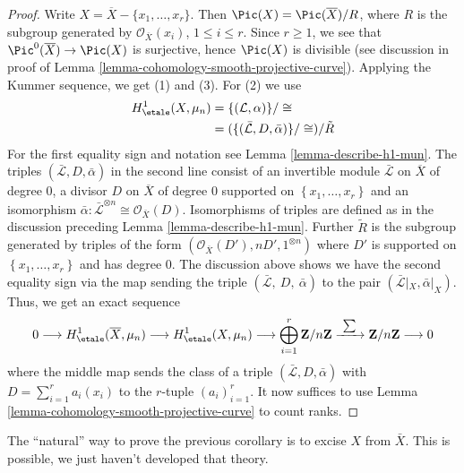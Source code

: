 \begin{proof}
Write $X = \overline{X} - \{ x_1, \ldots, x_r\}$. Then
$\Pic(X) = \Pic(\overline{X})/ R$, where $R$ is the subgroup generated by
$\mathcal{O}_{\overline{X}}(x_i)$, $1 \leq i \leq r$.
Since $r \geq 1$, we see that $\Pic^0(\overline{X}) \to \Pic(X)$
is surjective, hence $\Pic(X)$ is divisible (see discussion in proof
of Lemma \ref{lemma-cohomology-smooth-projective-curve}).
Applying the Kummer sequence, we get (1) and (3). For (2) we use
\begin{align*}
H_\etale^1(X, \mu_n)
& =
\{(\mathcal L, \alpha)\}/\cong \\
& =
(\{(\bar{\mathcal L}, D, \bar \alpha)\}/\cong)/\tilde{R}
\end{align*}
For the first equality sign and notation see Lemma \ref{lemma-describe-h1-mun}.
The triples $(\bar{\mathcal L}, D, \bar \alpha)$ in the second line
consist of an invertible module $\bar{\mathcal L}$ on $\overline{X}$
of degree $0$, a divisor $D$ on $\overline{X}$ of degree $0$ supported on
$\left\{x_1, \ldots, x_r\right\}$ and an isomorphism
$\bar{\alpha}: \bar{\mathcal L}^{\otimes n} \cong \mathcal{O}_{\bar{X}}(D)$.
Isomorphisms of triples are defined as in the discussion preceding
Lemma \ref{lemma-describe-h1-mun}.
Further $\tilde{R}$ is the subgroup generated by triples of the form
$(\mathcal{O}_{\overline{X}}(D'), n D', 1^{\otimes n})$
where $D'$ is supported on $\left\{x_1, \ldots, x_r\right\}$ and has degree 0.
The discussion above shows we have the second equality sign via
the map sending the triple $(\bar{\mathcal L},\ D,\ \bar \alpha)$
to the pair $(\bar{\mathcal L}|_X, \bar \alpha|_X)$. Thus,
we get an exact sequence
$$
0 \longrightarrow
H_\etale^1(\overline{X}, \mu_n) \longrightarrow
H_\etale^1(X, \mu_n) \longrightarrow
\bigoplus_{i = 1}^r \mathbf{Z}/n\mathbf{Z}
\xrightarrow{\ \sum\ }
\mathbf{Z}/n\mathbf{Z} \longrightarrow 0
$$
where the middle map sends the class of a triple
$(\bar{ \mathcal L}, D, \bar \alpha)$ with $D = \sum_{i = 1}^r a_i (x_i)$
to the $r$-tuple $(a_i)_{i = 1}^r$. It now suffices to use
Lemma \ref{lemma-cohomology-smooth-projective-curve}
to count ranks.
\end{proof}

\begin{remark}
\label{remark-natural-proof}
The ``natural'' way to prove the previous corollary is to excise $X$ from $\bar
X$. This is possible, we just haven't developed that theory.
\end{remark}

